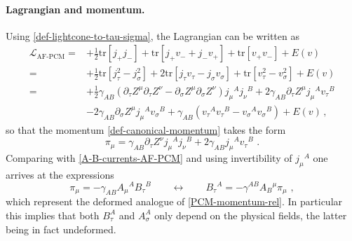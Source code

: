 \documentclass[12pt]{article}
\numberwithin{equation}{section}
\begin{document}
\paragraph{Lagrangian and momentum.} Using \eqref{def-lightcone-to-tau-sigma}, the Lagrangian can be written as
\begin{equation}
\begin{aligned}
\label{eq:lag_af_pcm}
\mathcal{L}_{\textrm{AF-PCM}}=&+\tfrac{1}{2}\mathrm{tr}[j_{+}j_{-}]+\mathrm{tr}[j_{+}v_{-}+j_{-}v_{+}]+\mathrm{tr}[v_{+}v_{-}]+E(v)
\\
=&+\tfrac{1}{2}\mathrm{tr}[j_{\tau}^2-j_{\sigma}^2]+2\mathrm{tr}[j_{\tau}v_{\tau}-j_{\sigma}v_{\sigma}]+\mathrm{tr}[v_{\tau}^2-v_{\sigma}^2]+E(v)
\\
=&+\tfrac{1}{2}\gamma_{AB}(\partial_{\tau}Z^{\mu}\partial_{\tau}Z^{\nu}-\partial_{\sigma}Z^{\mu}\partial_{\sigma}Z^{\nu})j_{\mu}{}^{A}j_{\nu}{}^{B}+2\gamma_{AB}\partial_{\tau}Z^{\mu}j_{\mu}{}^{A}v_{\tau}{}^{B}
\\
&-2\gamma_{AB}\partial_{\sigma}Z^{\mu}j_{\mu}{}^{A}v_{\sigma}{}^{B}+\gamma_{AB}(v_{\tau}{}^{A}v_{\tau}{}^{B}-v_{\sigma}{}^{A}v_{\sigma}{}^{B})+E(v) \, ,
\end{aligned}
\end{equation}
so that the momentum \eqref{def-canonical-momentum} takes the form
\begin{equation}
\pi_{\mu}=\gamma_{AB}\partial_{\tau}Z^{\nu}j_{\mu}{}^{A}j_{\nu}{}^{B}+2\gamma_{AB}j_{\mu}{}^{A}v_{\tau}{}^{B} \,\, .
\end{equation}
Comparing with \eqref{A-B-currents-AF-PCM} and using invertibility of $j_{\mu}{}^{A}$ one arrives at the expressions
\begin{equation}\label{AF-PCM-momentum-inversion}
\pi_{\mu}=-\gamma_{AB}A_{\mu}{}^{A}B_{\tau}{}^{B}
\qquad 
\longleftrightarrow \qquad 
B_{\tau}{}^{A}=-\gamma^{AB}A_{B}{}^{\mu}\pi_{\mu} \,\, ,
\end{equation}
which represent the deformed analogue of \eqref{PCM-momentum-rel}. In particular this implies that both $B_{\tau}^{A}$ and $A_{\sigma}^{A}$ only depend on the physical fields, the latter being in fact undeformed.
\end{document}
